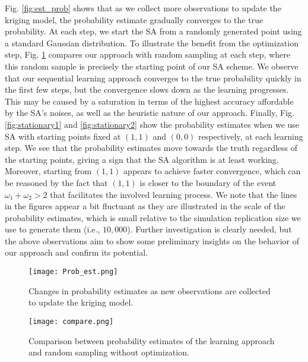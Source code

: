 \documentclass{wscpaperproc}
\theoremstyle{wsc}
\begin{document}
Fig. \ref{fig:est_prob} shows that as we collect more observations to update the kriging model, the probability estimate gradually converges to the true probability. At each step, we start the SA from a randomly generated point using a standard Gaussian distribution. To illustrate the benefit from the optimization step, Fig. \ref{fig:compare} compares our approach with random sampling at each step, where this random sample is precisely the starting point of our SA scheme. We observe that our sequential learning approach converges to the true probability quickly in the first few steps, but the convergence slows down as the learning progresses. This may be caused by a saturation in terms of the highest accuracy affordable by the SA's noises, as well as the heuristic nature of our approach. Finally, Fig. \ref{fig:stationary1} and \ref{fig:stationary2} show the probability estimates when we use SA with starting points fixed at $(1,1)$ and $(0,0)$ respectively, at each learning step. We see that the probability estimates move towards the truth regardless of the starting points, giving a sign that the SA algorithm is at least working. Moreover, starting from $(1,1)$ appears to achieve faster convergence, which can be reasoned by the fact that $(1,1)$ is closer to the boundary of the event $\omega_1+\omega_2>2$ that facilitates the involved learning process. We note that the lines in the figures appear a bit fluctuant as they are illustrated in the scale of the probability estimates, which is small relative to the simulation replication size we use to generate them (i.e., $10,000$). Further investigation is clearly needed, but the above observations aim to show some preliminary insights on the behavior of our approach and confirm its potential.


\begin{figure}[ht]
							\centering
							\begin{minipage}[b]{0.5\textwidth}
								\centering
                                \captionsetup{width=.9\linewidth}
	\texttt{[image: Prob\_est.png]}
	\caption{Changes in probability estimates as new observations are collected to update the kriging model.}
	\label{fig:est_prob}
							\end{minipage}%
							\begin{minipage}[b]{0.5\textwidth}
								\centering
                                \captionsetup{width=.9\linewidth}
	\texttt{[image: compare.png]}
	\caption{Comparison between probability estimates of the learning approach and random sampling without optimization.}
	\label{fig:compare}
							\end{minipage}
			\end{figure}
            
\end{document}
